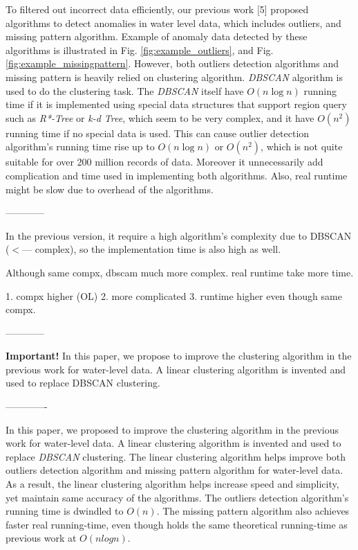 \documentclass[conference]{IEEEtran}
\begin{document}
To filtered out incorrect data efficiently, our previous work [5] proposed algorithms to detect anomalies in water level data, which includes outliers, and missing pattern algorithm. Example of anomaly data detected by these algorithms is illustrated in Fig. \ref{fig:example_outliers}, and Fig. \ref{fig:example_missingpattern}. However, both outliers detection algorithms and missing pattern is heavily relied on clustering algorithm. \textit{DBSCAN} algorithm is used to do the clustering task. The \textit{DBSCAN} itself have $O(n\log{n})$ running time if it is implemented using special data structures that support region query such as \textit{R*-Tree} or \textit{k-d Tree}, which seem to be very complex, and it have $O(n^2)$ running time if no special data is used. This can cause outlier detection algorithm's running time rise up to $O(n\log{n})$ or $O(n^2)$, which is not quite suitable for over 200 million records of data. Moreover it unnecessarily add complication and time used in implementing both algorithms. Also, real runtime might be slow due to overhead of the algorithms.

------------

In the previous version, it require a high algorithm's complexity due to DBSCAN ($<$--- complex), so the implementation time is also high as well.

Although same compx, dbscam much more complex. real runtime take more time.

1. compx higher (OL)
2. more complicated
3. runtime higher even though same compx.

------------

\textbf{\color{red} Important!}
In this paper, we propose to improve the clustering algorithm in the previous work for water-level data. A linear clustering algorithm is invented and used to replace DBSCAN clustering.

-------------

In this paper, we proposed to improve the clustering algorithm in the previous work for water-level data. A linear clustering algorithm is invented and used to replace \textit{DBSCAN} clustering. The linear clustering algorithm helps improve both outliers detection algorithm and missing pattern algorithm for water-level data. As a result, the linear clustering algorithm helps increase speed and simplicity, yet maintain same accuracy of the algorithms. The outliers detection algorithm's running time is dwindled to $O(n)$. The missing pattern algorithm also achieves faster real running-time, even though holds the same theoretical running-time as previous work at $O(n log{n})$.
\end{document}
